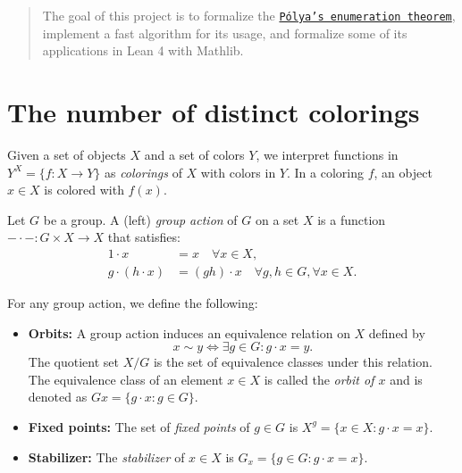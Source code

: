 %

\begin{abstract}
  The goal of this project is to formalize the \href{https://en.wikipedia.org/wiki/P%C3%B3lya_enumeration_theorem}{\texttt{Pólya's enumeration theorem}}, implement a fast algorithm for its usage, and formalize some of its applications in Lean 4 with Mathlib.
\end{abstract}

\section{The number of distinct colorings}

Given a set of objects $X$ and a set of colors $Y$, we interpret functions in $Y^X = \{f : X \to Y\}$ as \emph{colorings} of $X$ with colors in $Y$. In a coloring $f$, an object $x \in X$ is colored with $f(x)$.

Let $G$ be a group. A (left) \emph{group action} of $G$ on a set $X$ is a function ${-} \cdot {-} : G \times X \to X$ that satisfies:
\begin{align*}
  1 \cdot x &= x \quad \forall x \in X,\\
  g \cdot (h \cdot x) &= (gh) \cdot x \quad \forall g, h \in G, \forall x \in X.
\end{align*}

For any group action, we define the following:
\begin{itemize}
  \item \textbf{Orbits:} A group action induces an equivalence relation on $X$ defined by
        \begin{equation*}
          x \sim y \iff \exists g \in G : g \cdot x = y.
        \end{equation*}
        The quotient set $X / G$ is the set of equivalence classes under this relation. The equivalence class of an element $x \in X$ is called the \emph{orbit of $x$} and is denoted as $Gx = \{g \cdot x : g \in G\}$.
  
  \item \textbf{Fixed points:} The set of \emph{fixed points} of $g \in G$ is $X^g = \{x \in X : g \cdot x = x\}$.
  
  \item \textbf{Stabilizer:} The \emph{stabilizer} of $x \in X$ is $G_x = \{g \in G : g \cdot x = x\}$.
\end{itemize}

